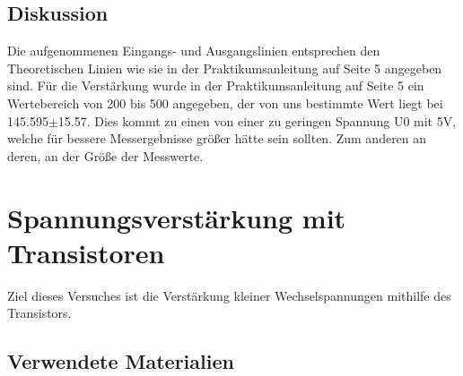 \documentclass[12pt,a4paper]{article}
\begin{document}
\subsection{Diskussion}

Die aufgenommenen Eingangs- und Ausgangslinien entsprechen den Theoretischen Linien wie sie in der Praktikumsanleitung auf Seite 5 angegeben sind. Für die Verstärkung wurde in der Praktikumsanleitung auf Seite 5 ein Wertebereich von 200 bis 500 angegeben, der von uns bestimmte Wert liegt bei 145.595$\pm$15.57. Dies kommt zu einen von einer zu geringen Spannung U0 mit 5V, welche für bessere Messergebnisse größer hätte sein sollten. Zum anderen an deren, an der Größe der Messwerte.

\section{Spannungsverstärkung mit Transistoren}
Ziel dieses Versuches ist die Verstärkung kleiner Wechselspannungen mithilfe des Transistors.
\subsection{Verwendete Materialien}
\end{document}
